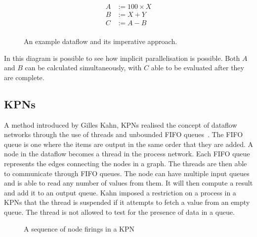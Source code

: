 \documentclass[dissertation.tex]{subfiles}
\begin{document}
\begin{figure}[ht]
  \centering
  \begin{subfigure}{0.3\textwidth}
    \centering
    \begin{equation*}
      \begin{aligned}
      A &:= 100 \times X \\
      B &:= X + Y \\
      C &:= A - B \\
      \end{aligned}
    \end{equation*}
    \caption{}
    \label{subfig:dataflow-example-equations}
  \end{subfigure}
  \begin{subfigure}{0.3\textwidth}
    \centering
    
    \caption{}
    \label{subfig:dataflow-example-diagram}
  \end{subfigure}
  \caption{An example dataflow and its imperative approach.}
    \label{fig:dataflow-example}
\end{figure}

In this diagram is possible to see how implicit parallelisation is possible.
Both $A$ and $B$ can be calculated simultaneously, with $C$ able to be evaluated after they are complete.


\subsection{\acfp{KPN}}
A method introduced by Gilles Kahn, \acfp{KPN} realised the concept of dataflow networks
through the use of threads and unbounded \ac{FIFO} queues~\cite{DBLP:conf/ifip/Kahn74}.
The \ac{FIFO} queue is one where the items are output in the same order that they are added.
A node in the dataflow becomes a thread in the process network.
Each \ac{FIFO} queue represents the edges connecting the nodes in a graph.
The threads are then able to communicate through \ac{FIFO} queues.
The node can have multiple input queues and is able to read any number of values from them.
It will then compute a result and add it to an output queue.
Kahn imposed a restriction on a process in a \acp{KPN} that the thread is suspended if it attempts to fetch a value from an empty queue.
The thread is not allowed to test for the presence of data in a queue.

\begin{figure}[ht]
  \centering
  
  \caption{A sequence of node firings in a \ac{KPN}}
  \label{fig:kpn-firing}
\end{figure}
\end{document}
